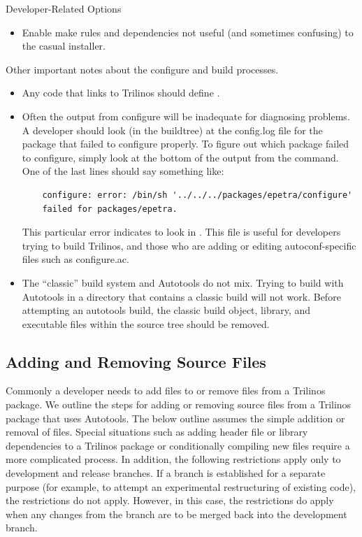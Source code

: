 \documentclass[12pt,strict]{TrilinosDevGuide}
\begin{document}
Developer-Related Options
\begin{itemize}
\item {}

Enable make rules and dependencies not useful (and sometimes confusing) to 
the casual installer.
\end{itemize}

Other important notes about the configure and build processes.
\begin{itemize}
\item Any code that links to Trilinos should define 
.

\item Often the output from configure will be inadequate for diagnosing 
problems.  A developer should look (in the buildtree) at the config.log file 
for the package that failed to configure properly.  To figure out which 
package failed to configure, simply look at the bottom of the output from the 
 command.  One of the last lines should say something 
like:

\begin{verbatim}
    configure: error: /bin/sh '../../../packages/epetra/configure' 
    failed for packages/epetra.
\end{verbatim}

This particular error indicates to look in 
.  This file is useful for 
developers trying to build Trilinos, and those who are 
adding or editing autoconf-specific files such as configure.ac.

\item The ``classic'' build system and Autotools do not mix.  Trying to build 
with Autotools in a directory that contains a classic build will not work.  
Before attempting an autotools build, the classic build object, library, and 
executable files within the source tree should be removed.
\end{itemize}

\subsection{Adding and Removing Source Files}
\label{Subsection:AddSource}
Commonly a developer needs to add files to or remove files from a Trilinos 
package.  We outline the steps for adding or removing source files from a 
Trilinos package that uses Autotools.  The below outline assumes the simple 
addition or removal of files.  Special situations such as adding header file 
or library dependencies to a Trilinos package or conditionally compiling new 
files require a more complicated process.  In addition, the following 
restrictions apply only to development and release branches.  If a branch is 
established for a separate purpose (for example, to attempt an experimental 
restructuring of existing code), the restrictions do not apply.  However, in 
this case, the restrictions do apply when any changes from the branch are to 
be merged back into the development branch.
 
\end{document}
